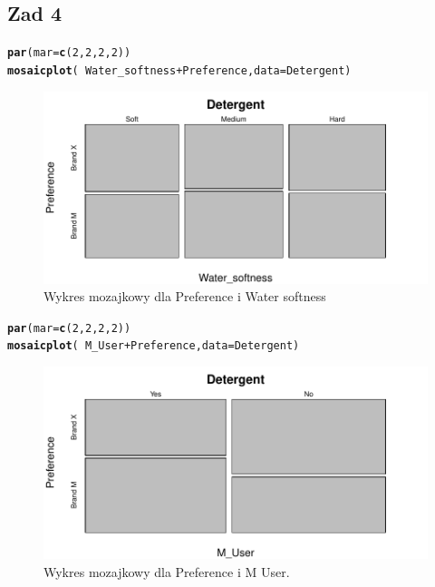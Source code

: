 \documentclass[12pt]{mwart}\usepackage[]{graphicx}\usepackage[]{color}
\makeatletter
\def\maxwidth{ %
  \ifdim\Gin@nat@width>\linewidth
    \linewidth
  \else
    \Gin@nat@width
  \fi
}
\newcommand{\hlnum}[1]{\textcolor[rgb]{0.686,0.059,0.569}{#1}}%
\newcommand{\hlopt}[1]{\textcolor[rgb]{0,0,0}{#1}}%
\newcommand{\hlstd}[1]{\textcolor[rgb]{0.345,0.345,0.345}{#1}}%
\newcommand{\hlkwc}[1]{\textcolor[rgb]{0.333,0.667,0.333}{#1}}%
\newcommand{\hlkwd}[1]{\textcolor[rgb]{0.737,0.353,0.396}{\textbf{#1}}}%
\newenvironment{kframe}{%
 \def\at@end@of@kframe{}%
 \ifinner\ifhmode%
  \def\at@end@of@kframe{\end{minipage}}%
  \begin{minipage}{\columnwidth}%
 \fi\fi%
 \def\FrameCommand##1{\hskip\@totalleftmargin \hskip-\fboxsep
 \colorbox{shadecolor}{##1}\hskip-\fboxsep
     \hskip-\linewidth \hskip-\@totalleftmargin \hskip\columnwidth}%
 \MakeFramed {\advance\hsize-\width
   \@totalleftmargin\z@ \linewidth\hsize
   \@setminipage}}%
 {\par\unskip\endMakeFramed%
 \at@end@of@kframe}
\newenvironment{knitrout}{}{} %
\makeatother
\begin{document}
  \subsection*{Zad 4}
\begin{knitrout}
\color{fgcolor}\begin{kframe}
\begin{alltt}
\hlkwd{par}\hlstd{(}\hlkwc{mar} \hlstd{=} \hlkwd{c}\hlstd{(}\hlnum{2}\hlstd{,} \hlnum{2}\hlstd{,} \hlnum{2}\hlstd{,} \hlnum{2}\hlstd{))}
\hlkwd{mosaicplot}\hlstd{(}\hlopt{~}\hlstd{Water_softness}\hlopt{+}\hlstd{Preference,} \hlkwc{data} \hlstd{= Detergent)}
\end{alltt}
\end{kframe}\begin{figure}[H]
\includegraphics[width=\maxwidth]{figure/r_fig_3-1} \caption{\label{fig:3}Wykres mozajkowy dla Preference i Water softness}\label{fig:r fig_3}
\end{figure}

\end{knitrout}
\begin{knitrout}
\color{fgcolor}\begin{kframe}
\begin{alltt}
\hlkwd{par}\hlstd{(}\hlkwc{mar} \hlstd{=} \hlkwd{c}\hlstd{(}\hlnum{2}\hlstd{,} \hlnum{2}\hlstd{,} \hlnum{2}\hlstd{,} \hlnum{2}\hlstd{))}
\hlkwd{mosaicplot}\hlstd{(}\hlopt{~}\hlstd{M_User}\hlopt{+}\hlstd{Preference,} \hlkwc{data} \hlstd{= Detergent)}
\end{alltt}
\end{kframe}\begin{figure}[H]
\includegraphics[width=\maxwidth]{figure/r_fig_4-1} \caption{\label{fig:4}Wykres mozajkowy dla Preference i M User.}\label{fig:r fig_4}
\end{figure}

\end{knitrout}
\end{document}
